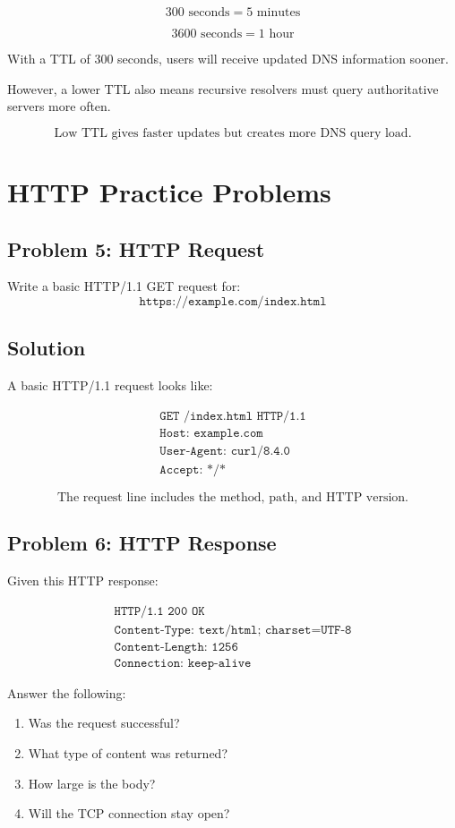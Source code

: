 \documentclass[12pt]{article}
\begin{document}
\[
300 \text{ seconds} = 5 \text{ minutes}
\]

\[
3600 \text{ seconds} = 1 \text{ hour}
\]

With a TTL of 300 seconds, users will receive updated DNS information sooner.

However, a lower TTL also means recursive resolvers must query authoritative servers more often.

\[
\boxed{\text{Low TTL gives faster updates but creates more DNS query load.}}
\]

\section*{HTTP Practice Problems}

\subsection*{Problem 5: HTTP Request}
Write a basic HTTP/1.1 GET request for:
\[
\texttt{https://example.com/index.html}
\]

\subsection*{Solution}
A basic HTTP/1.1 request looks like:

\[
\begin{array}{l}
\texttt{GET /index.html HTTP/1.1} \\
\texttt{Host: example.com} \\
\texttt{User-Agent: curl/8.4.0} \\
\texttt{Accept: */*}
\end{array}
\]

\[
\boxed{\text{The request line includes the method, path, and HTTP version.}}
\]

\subsection*{Problem 6: HTTP Response}
Given this HTTP response:

\[
\begin{array}{l}
\texttt{HTTP/1.1 200 OK} \\
\texttt{Content-Type: text/html; charset=UTF-8} \\
\texttt{Content-Length: 1256} \\
\texttt{Connection: keep-alive}
\end{array}
\]

Answer the following:
\begin{enumerate}
    \item Was the request successful?
    \item What type of content was returned?
    \item How large is the body?
    \item Will the TCP connection stay open?
\end{enumerate}
\end{document}
